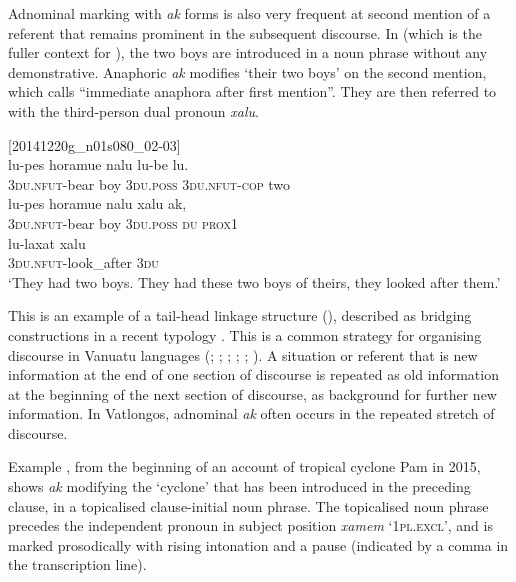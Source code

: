 \documentclass[output=paper,colorlinks,citecolor=brown]{langscibook}
\begin{document}
Adnominal marking with \textit{ak} forms is also very frequent at second mention of a referent that remains prominent in the subsequent discourse. In  (which is the fuller context for ), the two boys are introduced in a noun phrase without any demonstrative. Anaphoric \textit{ak} modifies ‘their two boys’ on the second mention, which \citet[385]{Lichtenberk1996} calls “immediate anaphora after first mention”. They are then referred to with the third-person dual pronoun \textit{xalu}.

\ea
{\label{ex:ridge:39}[20141220g\_n01s080\_02-03]}\\
\gll lu-pes     horamue   nalu     lu-be       lu. \\
     \textsc{3du.nfut}{}-bear   boy   \textsc{3du.poss}   \textsc{3du.nfut-cop} two\\

\gll lu-pes       horamue   nalu     xalu     ak, \\
     \textsc{3du.nfut}{}-bear   boy     \textsc{3du.poss}   \textsc{du}   \textsc{prox1}\\
\gll lu-laxat       xalu\\
     \textsc{3du.nfut}{}-look\_after   \textsc{3du}\\
\glt ‘They had two boys. They had these two boys of theirs, they looked after them.’
\z

This is an example of a tail-head linkage structure (\citealt{Vries2005}), described as bridging constructions in a recent typology \citep{Guérin2019}. This is a common strategy for organising discourse in Vanuatu languages (\citealt[454]{Early1994}; \citealt[426-427]{Hyslop2001}; \citealt[324-325]{Thieberger2004}; \citealt[240]{Schneider2010}; \citealt[298-299]{Brotchie2009}; \citealt[376]{Jauncey2011}). A situation or referent that is new information at the end of one section of discourse is repeated as old information at the beginning of the next section of discourse, as background for further new information. In Vatlongos, adnominal \textit{ak} often occurs in the repeated stretch of discourse.

Example , from the beginning of an account of tropical cyclone Pam in 2015, shows \textit{ak} modifying the ‘cyclone’ that has been introduced in the preceding clause, in a topicalised clause-initial noun phrase. The topicalised noun phrase precedes the independent pronoun in subject position \textit{xamem} ‘\textsc{1pl.excl}’, and is marked prosodically with rising intonation and a pause (indicated by a comma in the transcription line).
\end{document}
